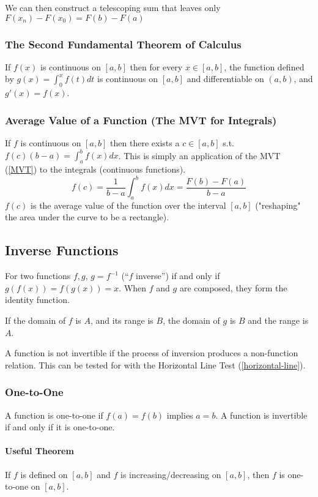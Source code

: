 \documentclass{article}
\begin{document}
We can then construct a telescoping sum that leaves only $F(x_n)-F(x_0)=F(b)-F(a)$

\subsubsection{The Second Fundamental Theorem of Calculus}
If $f(x)$ is continuous on $[a,b]$ then for every $x\in[a,b]$, the function defined by $g(x)=\int_0^xf(t)dt$ is continuous on $[a,b]$ and differentiable on $(a,b)$, and $g'(x)=f(x)$.

\subsubsection{Average Value of a Function (The MVT for Integrals)}
If $f$ is continuous on $[a,b]$ then there exists a $c\in[a,b]$ s.t. $f(c)(b-a)=\int_a^bf(x)dx$. This is simply an application of the MVT (\ref{MVT}) to the integrals (continuous functions).
$$f(c) = \frac{1}{b-a}\int_a^bf(x)dx=\frac{F(b)-F(a)}{b-a}$$
$f(c)$ is the average value of the function over the interval $[a,b]$ ("reshaping" the area under the curve to be a rectangle).

\subsection{Inverse Functions}
For two functions $f,g$, $g=f^{-1}$ (``$f$ inverse'') if and only if $g(f(x)) = f(g(x)) = x$. When $f$ and $g$ are composed, they form the identity function.

If the domain of $f$ is $A$, and its range is $B$, the domain of $g$ is $B$ and the range is $A$.

A function is not invertible if the process of inversion produces a non-function relation. This can be tested for with the Horizontal Line Test (\ref{horizontal-line}).

\subsubsection{One-to-One}
A function is one-to-one if $f(a)=f(b)$ implies $a=b$. A function is invertible if and only if it is one-to-one.

\paragraph{Useful Theorem} If $f$ is defined on $[a,b]$ and $f$ is increasing/decreasing on $[a,b]$, then $f$ is one-to-one on $[a,b]$.
\end{document}
